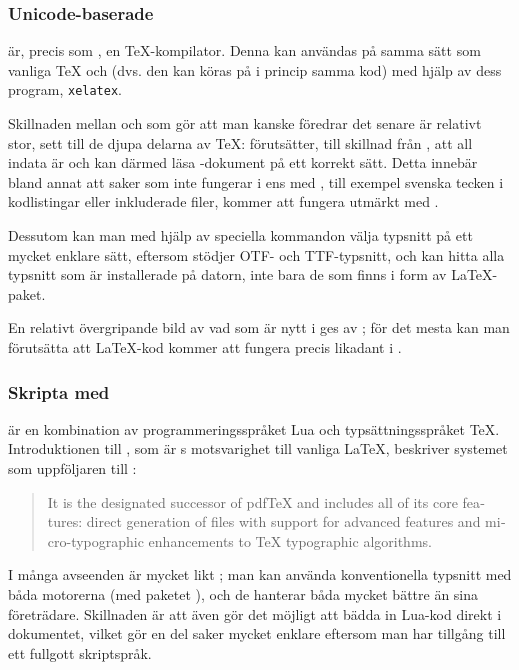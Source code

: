 \documentclass[lang=sv,ptsize=10pt,font=none,nomath,titles=bf,../../a4.tex]{subfiles}
\begin{document}
\subsubsection{Unicode-baserade \XeTeX}
\XeTeX är, precis som \pdfLaTeX, en \TeX-kompilator. Denna kan användas
på samma sätt som vanliga \TeX{} och \pdfLaTeX (dvs. den kan köras på i
princip samma kod) med hjälp av dess program, \texttt{xelatex}.

Skillnaden mellan \pdfLaTeX{} och \XeTeX som gör att man kanske föredrar
det senare är relativt stor, sett till de djupa delarna av \TeX: \XeTeX 
förutsätter, till skillnad från \pdfLaTeX, att all indata är \UTF och kan
därmed läsa \UTF-dokument på ett korrekt sätt. Detta innebär bland annat
att saker som inte fungerar i \pdfLaTeX ens med , till
exempel svenska tecken i kodlistingar eller inkluderade filer, kommer att
fungera utmärkt med \XeTeX.

Dessutom kan man med hjälp av speciella kommandon välja typsnitt på ett
mycket enklare sätt, eftersom \XeTeX stödjer \textsc{OTF}- och
\textsc{TTF}-typsnitt, och kan hitta alla typsnitt som är installerade
på datorn, inte bara de som finns i form av \LaTeX-paket.

En relativt övergripande bild av vad som är nytt i \XeTeX ges av
; för det mesta kan man förutsätta att \LaTeX-kod
kommer att fungera precis likadant i \XeTeX.

\subsubsection{Skripta med }
 är en kombination av programmeringsspråket Lua och
typsättningsspråket \TeX. Introduktionen till ,
som är s motsvarighet till vanliga \LaTeX,
beskriver systemet som uppföljaren till \pdfLaTeX:
\begin{quote}
	\begin{english}
		It is the designated successor of pdf\TeX{} and includes all of 
		its core features: direct generation of \PDF files with support 
		for advanced \PDF features and micro-typographic enhancements to 
		\TeX{} typographic algorithms.
		
		\hfill\cite{Gonnard10}\hspace{-1ex}%
	\end{english}
\end{quote}

I många avseenden är  mycket likt \XeTeX; man kan använda
konventionella typsnitt med båda motorerna (med paketet ), 
och de hanterar båda \UTF 
mycket bättre än sina företrädare. Skillnaden är att 
även gör det möjligt att bädda in Lua-kod direkt i dokumentet, vilket gör
en del saker mycket enklare eftersom man har tillgång till ett fullgott
skriptspråk.
\end{document}
